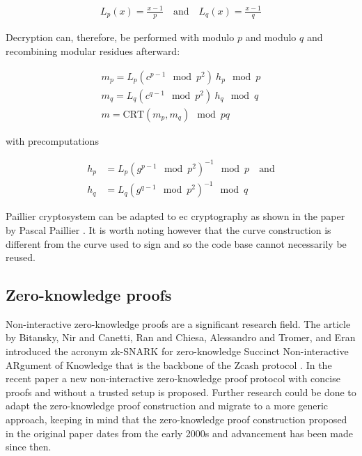 \begin{ceqn}
\begin{align*}
  L_p(x) = \frac{x-1}{p} \quad \text{and} \quad L_q(x) = \frac{x-1}{q}
\end{align*}
\end{ceqn}

Decryption can, therefore, be performed with modulo $p$ and modulo $q$ and
recombining modular residues afterward:

\begin{ceqn}
\begin{align*}
  m_p = L_p(c^{p-1} \mod p^2) \ h_p \mod p \\
  m_q = L_q(c^{q-1} \mod p^2) \ h_q \mod q \\
  m = \text{CRT}(m_p, m_q) \mod pq
\end{align*}
\end{ceqn}

with precomputations

\begin{ceqn}
\begin{align*}
  h_p &= L_p(g^{p-1} \mod p^2)^{-1} \mod p \quad \text{and} \\
  h_q &= L_q(g^{q-1} \mod p^2)^{-1} \mod q
\end{align*}
\end{ceqn}

Paillier cryptosystem can be adapted to \gls{ec} cryptography as shown in the
paper  by
Pascal Paillier \cite{10.1007/3-540-44448-3_44}. It is worth noting however that
the curve construction is different from the curve used to sign and so the code
base cannot necessarily be reused.

\subsection{Zero-knowledge proofs}

Non-interactive zero-knowledge proofs are a significant research field. The
article  by Bitansky, Nir and Canetti, Ran and
Chiesa, Alessandro and Tromer, and Eran \cite{Bitansky:2012:ECR:2090236.2090263}
introduced the acronym zk-SNARK for zero-knowledge Succinct Non-interactive
ARgument of Knowledge that is the backbone of the Zcash protocol
\cite{cryptoeprint:2014:349}. In the recent paper  \cite{cryptoeprint:2017:1066} a new
non-interactive zero-knowledge proof protocol with concise proofs and without a
trusted setup is proposed. Further research could be done to adapt the
zero-knowledge proof construction and migrate to a more generic approach, keeping
in mind that the zero-knowledge proof construction proposed in the original
paper dates from the early 2000s and advancement has been made since then.


